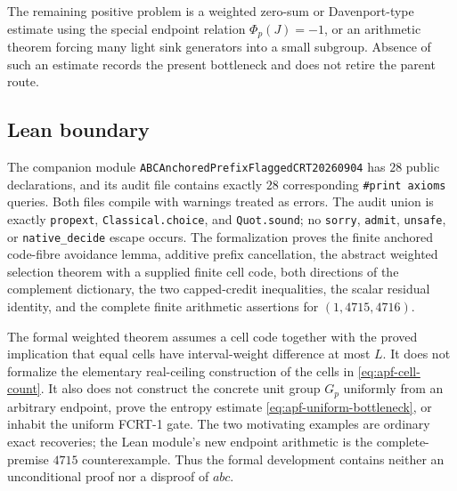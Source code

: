 The remaining positive problem is a weighted zero-sum or Davenport-type
estimate using the special endpoint relation $\Phi_p(J)=-1$, or an arithmetic
theorem forcing many light sink generators into a small subgroup.  Absence
of such an estimate records the present bottleneck and does not retire the
parent route.

\subsection{Lean boundary}

The companion module
\texttt{ABCAnchoredPrefixFlaggedCRT20260904} has $28$ public declarations,
and its audit file contains exactly $28$ corresponding
\texttt{\#print axioms} queries.  Both files compile with warnings treated as
errors.  The audit union is exactly \texttt{propext},
\texttt{Classical.choice}, and \texttt{Quot.sound}; no \texttt{sorry},
\texttt{admit}, \texttt{unsafe}, or \texttt{native\_decide} escape occurs.
The formalization proves the finite
anchored code-fibre avoidance lemma, additive prefix cancellation, the
abstract weighted selection theorem with a supplied finite cell code,
both directions of the complement dictionary, the two capped-credit
inequalities, the scalar residual identity, and the complete finite
arithmetic assertions for $(1,4715,4716)$.

The formal weighted theorem assumes a cell code together with the proved
implication that equal cells have interval-weight difference at most $L$.
It does not formalize the elementary real-ceiling construction of the cells
in \eqref{eq:apf-cell-count}.  It also does not construct the concrete unit
group $G_p$ uniformly from an arbitrary endpoint, prove the entropy estimate
\eqref{eq:apf-uniform-bottleneck}, or inhabit the uniform FCRT-1 gate.  The
two motivating examples are ordinary exact recoveries; the Lean module's
new endpoint arithmetic is the complete-premise $4715$ counterexample.
Thus the formal development contains neither an unconditional proof nor a
disproof of $abc$.
